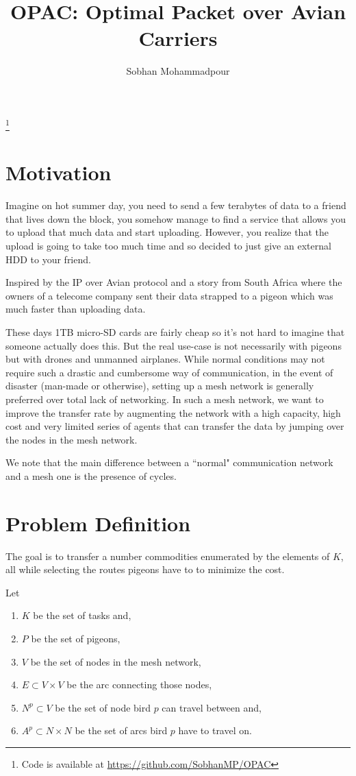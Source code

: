 \documentclass{article}
\author{Sobhan Mohammadpour}
\title{OPAC: Optimal Packet over Avian Carriers}
\newcommand\blfootnote[1]{%
	\begingroup
	\renewcommand\thefootnote{}\footnote{#1}%
	\addtocounter{footnote}{-1}%
	\endgroup
}
\begin{document}
	\maketitle
	\blfootnote{Code is available at \url{https://github.com/SobhanMP/OPAC}}
	\section{Motivation}
	
	Imagine on hot summer day, you need to send a few terabytes of data to a friend that lives down the block, you somehow manage to find a service that allows you to upload that much data and start uploading. However, you realize that the upload is going to take too much time and so decided to just give an external HDD to your friend.
	
	
	Inspired by the IP over Avian protocol  and a story from South Africa \parencite{abellAfricaPigeonTransfers} where the owners of a telecome company sent their data strapped to a pigeon which was much faster than uploading data. 
	
	These days 1TB micro-SD cards are fairly cheap so it's not hard to imagine that someone actually does this. But the real use-case is not necessarily with pigeons but with drones and unmanned airplanes. While normal conditions may not require such a drastic and cumbersome way of communication, in the event of disaster (man-made or otherwise), setting up a mesh network is generally preferred over total lack of networking. In such a mesh network, we want to improve the transfer rate by augmenting the network with a high capacity, high cost and very limited series of agents that can transfer the data by jumping over the nodes in the mesh network.
	
	We note that the main difference between a ``normal" communication network and a mesh one is the presence of cycles.
	
	\section{Problem Definition}
	The goal is to transfer a number commodities enumerated by the elements of $K$, all while selecting the routes pigeons have to to minimize the cost.
	
	
	Let
	\begin{enumerate}
			\item $K$ be the set of tasks and,
		\item $P$ be the set of pigeons,
		\item $V$ be the set of nodes in the mesh network,
		\item $E \subset V \times V$ be the arc connecting those nodes,
		\item $N^p \subset V$ be the set of node bird $p$ can travel between and,
		\item $A^p \subset N\times N$ be the set of arcs bird $p$ have to travel on.
	\end{enumerate}
\end{document}
